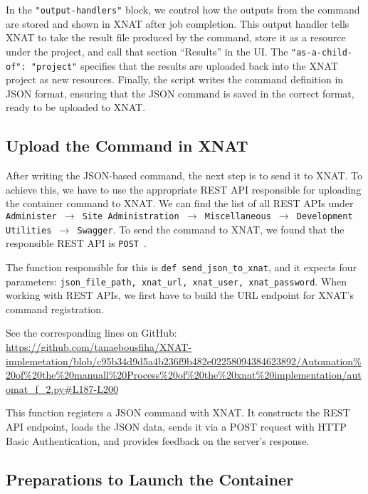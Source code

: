 In the \texttt{"output-handlers"} block, we control how the outputs from the command are stored and shown in XNAT after job completion. This output handler tells XNAT to take the result file produced by the command, store it as a resource under the project, and call that section ``Results'' in the UI. The \texttt{"as-a-child-of": "project"} specifies that the results are uploaded back into the XNAT project as new resources.
\normalsize
Finally, the script writes the command definition in JSON format, ensuring that the JSON command is saved in the correct format, ready to be uploaded to XNAT.

\subsection{Upload the Command in XNAT}

After writing the JSON-based command, the next step is to send it to XNAT. To achieve this, we have to use the appropriate REST API responsible for uploading the container command to XNAT.
We can find the list of all REST APIs under \texttt{Administer $\rightarrow$ Site Administration $\rightarrow$ Miscellaneous $\rightarrow$ Development Utilities $\rightarrow$ Swagger}.
To send the command to XNAT, we found that the responsible REST API is \texttt{POST}~\cite{ContainerRESTAPILIST}.

The function responsible for this is \texttt{def send\_json\_to\_xnat}, and it expects four parameters: \texttt{json\_file\_path, xnat\_url, xnat\_user, xnat\_password}. When working with REST APIs, we first have to build the URL endpoint for XNAT’s command registration.
 


\noindent\footnotesize See the corresponding lines on GitHub:\url{ https://github.com/tanaebousfiha/XNAT-implemetation/blob/c95b34d9d5a4b236f9b482e02258094384623892/Automation%20of%20the%20manuall%20Process%20of%20the%20xnat%20implementation/automat_f_2.py#L187-L200}
\normalsize

This function registers a JSON command with XNAT. It constructs the REST API endpoint, loads the JSON data, sends it via a POST request with HTTP Basic Authentication, and provides feedback on the server's response.

\subsection{Preparations to Launch the Container}

